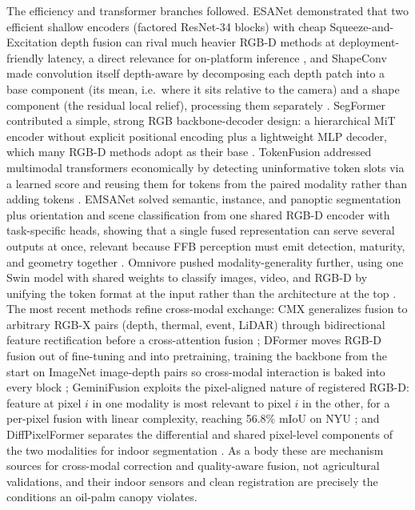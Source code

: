 The efficiency and transformer branches followed. ESANet demonstrated that two efficient shallow encoders (factored ResNet-34 blocks) with cheap Squeeze-and-Excitation depth fusion can rival much heavier RGB-D methods at deployment-friendly latency, a direct relevance for on-platform inference \cite{seichter2021esanet}, and ShapeConv made convolution itself depth-aware by decomposing each depth patch into a base component (its mean, i.e.\ where it sits relative to the camera) and a shape component (the residual local relief), processing them separately \cite{cao2021shapeconv}. SegFormer contributed a simple, strong RGB backbone-decoder design: a hierarchical MiT encoder without explicit positional encoding plus a lightweight MLP decoder, which many RGB-D methods adopt as their base \cite{xie2021segformer}. TokenFusion addressed multimodal transformers economically by detecting uninformative token slots via a learned score and reusing them for tokens from the paired modality rather than adding tokens \cite{wang2022tokenfusion}. EMSANet solved semantic, instance, and panoptic segmentation plus orientation and scene classification from one shared RGB-D encoder with task-specific heads, showing that a single fused representation can serve several outputs at once, relevant because FFB perception must emit detection, maturity, and geometry together \cite{seichter2022emsanet}. Omnivore pushed modality-generality further, using one Swin model with shared weights to classify images, video, and RGB-D by unifying the token format at the input rather than the architecture at the top \cite{girdhar2022omnivore}. The most recent methods refine cross-modal exchange: CMX generalizes fusion to arbitrary RGB-X pairs (depth, thermal, event, LiDAR) through bidirectional feature rectification before a cross-attention fusion \cite{zhang2023cmx}; DFormer moves RGB-D fusion out of fine-tuning and into pretraining, training the backbone from the start on ImageNet image-depth pairs so cross-modal interaction is baked into every block \cite{yin2024dformer}; GeminiFusion exploits the pixel-aligned nature of registered RGB-D: feature at pixel $i$ in one modality is most relevant to pixel $i$ in the other, for a per-pixel fusion with linear complexity, reaching 56.8\% mIoU on NYU \cite{jia2024geminifusion}; and DiffPixelFormer separates the differential and shared pixel-level components of the two modalities for indoor segmentation \cite{gong2025diffpixelformer}. As a body these are mechanism sources for cross-modal correction and quality-aware fusion, not agricultural validations, and their indoor sensors and clean registration are precisely the conditions an oil-palm canopy violates.

